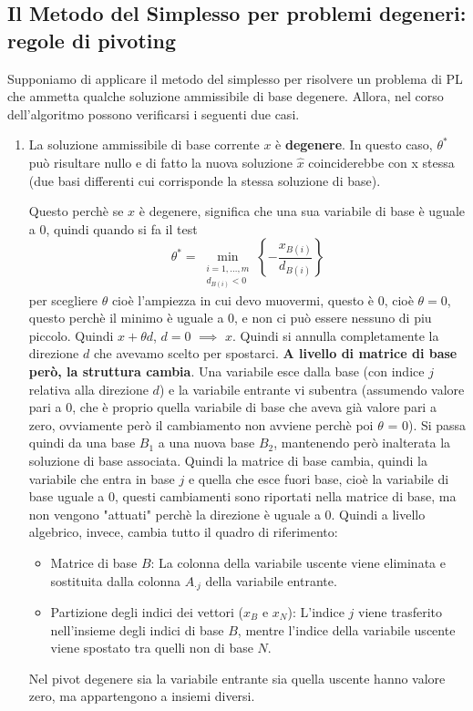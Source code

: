 \subsection{Il Metodo del Simplesso per problemi degeneri: regole di pivoting}
Supponiamo di applicare il metodo del simplesso per risolvere un problema
di PL che ammetta qualche soluzione ammissibile di base degenere. Allora,
nel corso dell'algoritmo possono verificarsi i seguenti due casi.
\begin{enumerate}
    \item La soluzione ammissibile di base corrente $x$ è \textbf{degenere}. In questo caso,
$\theta^*$ può risultare nullo e di fatto la nuova soluzione $\hat{x}$ coinciderebbe
con x stessa (due basi differenti cui corrisponde la stessa soluzione di
base).

Questo perchè se $x$ è degenere, significa che una sua variabile di base è uguale a 0, quindi quando si fa il test
\[
    \boxed{
    \theta^*=
    \min_{\substack{i=1,\ldots,m\\d_{B(i)}<0}}
    \left\{-\frac{x_{B(i)}}{d_{B(i)}}\right\}
    }
\]
per scegliere $\theta$ cioè l'ampiezza in cui devo muovermi, questo è 0, cioè $\theta = 0$, questo perchè il minimo è uguale a 0, e non ci può essere nessuno di piu piccolo.
Quindi $x + \theta d$, $d = 0$ $\implies$ $x$.
Quindi si annulla completamente la direzione $d$ che avevamo scelto per spostarci.
\textbf{A livello di matrice di base però, la struttura cambia}. Una variabile esce dalla base (con indice $j$ relativa alla direzione $d$) e la variabile entrante vi subentra (assumendo valore pari a $0$, che è proprio quella variabile di base che aveva già valore pari a zero, ovviamente però il cambiamento non avviene perchè poi $\theta$ = 0). Si passa quindi da una base $B_1$ a una nuova base $B_2$, mantenendo però inalterata la soluzione di base associata.
Quindi la matrice di base cambia, quindi la variabile che entra in base $j$ e quella che esce fuori base, cioè la variabile di base uguale a 0, questi cambiamenti sono riportati nella matrice di base, ma non vengono "attuati" perchè la direzione è uguale a 0.
Quindi a livello algebrico, invece, cambia tutto il quadro di riferimento:
\begin{itemize}
    \item Matrice di base $B$: La colonna della variabile uscente viene eliminata e sostituita dalla colonna $A_{\cdot j}$ della variabile entrante.
    \item Partizione degli indici dei vettori ($x_B$ e $x_N$): L'indice $j$ viene trasferito nell'insieme degli indici di base $B$, mentre l'indice della variabile uscente viene spostato tra quelli non di base $N$.
\end{itemize}
Nel pivot degenere sia la variabile entrante sia quella uscente hanno valore zero, ma appartengono a insiemi diversi.


\end{enumerate}
